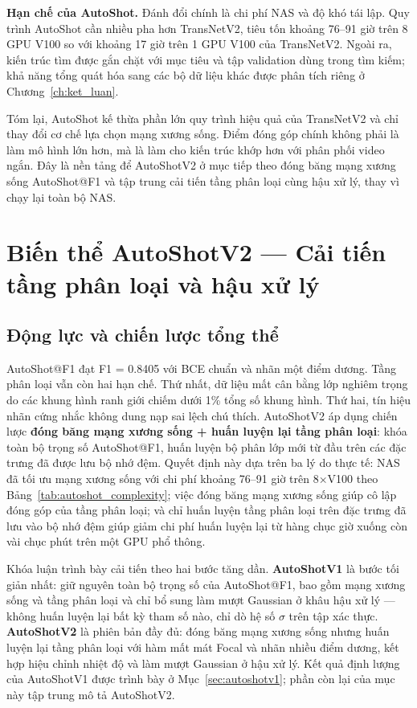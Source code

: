 \textbf{Hạn chế của AutoShot.} Đánh đổi chính là chi phí NAS và độ khó tái lập. Quy trình AutoShot cần nhiều pha hơn TransNetV2, tiêu tốn khoảng 76--91 giờ trên 8 GPU V100 so với khoảng 17 giờ trên 1 GPU V100 của TransNetV2. Ngoài ra, kiến trúc tìm được gắn chặt với mục tiêu và tập validation dùng trong tìm kiếm; khả năng tổng quát hóa sang các bộ dữ liệu khác được phân tích riêng ở Chương~\ref{ch:ket_luan}.

Tóm lại, AutoShot kế thừa phần lớn quy trình hiệu quả của TransNetV2 và chỉ thay đổi cơ chế lựa chọn mạng xương sống. Điểm đóng góp chính không phải là làm mô hình lớn hơn, mà là làm cho kiến trúc khớp hơn với phân phối video ngắn. Đây là nền tảng để AutoShotV2 ở mục tiếp theo đóng băng mạng xương sống AutoShot@F1 và tập trung cải tiến tầng phân loại cùng hậu xử lý, thay vì chạy lại toàn bộ NAS.

\section{Biến thể AutoShotV2 --- Cải tiến tầng phân loại và hậu xử lý}
\label{sec:autoshotv2}

\subsection{Động lực và chiến lược tổng thể}
\label{subsec:v2_motivation}

AutoShot@F1 đạt F1 = 0.8405 với BCE chuẩn và nhãn một điểm dương. Tầng phân loại vẫn còn hai hạn chế. Thứ nhất, dữ liệu mất cân bằng lớp nghiêm trọng do các khung hình ranh giới chiếm dưới 1\% tổng số khung hình. Thứ hai, tín hiệu nhãn cứng nhắc không dung nạp sai lệch chú thích. AutoShotV2 áp dụng chiến lược \textbf{đóng băng mạng xương sống + huấn luyện lại tầng phân loại}: khóa toàn bộ trọng số AutoShot@F1, huấn luyện bộ phân lớp mới từ đầu trên các đặc trưng đã được lưu bộ nhớ đệm. Quyết định này dựa trên ba lý do thực tế: NAS đã tối ưu mạng xương sống với chi phí khoảng 76--91 giờ trên 8$\times$V100 theo Bảng~\ref{tab:autoshot_complexity}; việc đóng băng mạng xương sống giúp cô lập đóng góp của tầng phân loại; và chỉ huấn luyện tầng phân loại trên đặc trưng đã lưu vào bộ nhớ đệm giúp giảm chi phí huấn luyện lại từ hàng chục giờ xuống còn vài chục phút trên một GPU phổ thông.

Khóa luận trình bày cải tiến theo hai bước tăng dần. \textbf{AutoShotV1} là bước tối giản nhất: giữ nguyên toàn bộ trọng số của AutoShot@F1, bao gồm mạng xương sống và tầng phân loại và chỉ bổ sung làm mượt Gaussian ở khâu hậu xử lý --- không huấn luyện lại bất kỳ tham số nào, chỉ dò hệ số $\sigma$ trên tập xác thực. \textbf{AutoShotV2} là phiên bản đầy đủ: đóng băng mạng xương sống nhưng huấn luyện lại tầng phân loại với hàm mất mát Focal và nhãn nhiều điểm dương, kết hợp hiệu chỉnh nhiệt độ và làm mượt Gaussian ở hậu xử lý. Kết quả định lượng của AutoShotV1 được trình bày ở Mục~\ref{sec:autoshotv1}; phần còn lại của mục này tập trung mô tả AutoShotV2.

